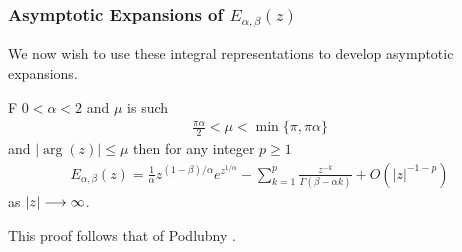 \subsubsection{Asymptotic Expansions of $ E_{\alpha, \beta}(z) $}
\label{sec:mit_lef_asym_exp}
We now wish to use these integral representations to develop asymptotic expansions.
\begin{lemma}
    \label{lem:mit_lef_asym_exp_1}
    F $ 0 < \alpha < 2 $ and $ \mu $ is such
    \begin{align}
        \frac{\pi \alpha}{2} < \mu < \min\{\pi, \pi\alpha \}
    \end{align}
    and $ | \arg(z) | \leq \mu $
    then for any integer $ p \geq 1 $    
    \begin{align}
        E_{\alpha, \beta}(z) = \frac{1}{\alpha} z^{(1 - \beta) / \alpha} e^{z^{1/\alpha}} - \sum_{k=1}^p \frac{z^{-k}}{\Gamma(\beta - \alpha k)} + O(|z|^{-1-p})
    \end{align}
    as $ |z| \longrightarrow \infty $.
\end{lemma}
This proof follows that of Podlubny \cite{Podlubny1999}.
